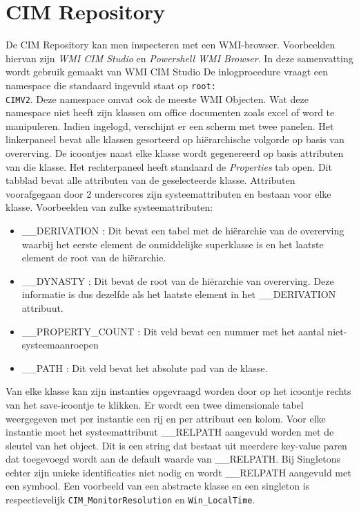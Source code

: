 \documentclass{report}
\begin{document}
	\section{CIM Repository}
	De CIM Repository kan men inspecteren met een WMI-browser. Voorbeelden hiervan zijn \textit{WMI CIM Studio} en \textit{Powershell WMI Browser}. In deze samenvatting wordt gebruik gemaakt van WMI CIM Studio
	De inlogprocedure vraagt een namespace die standaard ingevuld staat op \texttt{root:\\CIMV2}. Deze namespace omvat ook de meeste WMI Objecten. Wat deze namespace niet heeft zijn klassen om office documenten zoals excel of word te manipuleren.
	Indien ingelogd, verschijnt er een scherm met twee panelen. Het linkerpaneel bevat alle klassen gesorteerd op hiërarchische volgorde op basis van overerving. De icoontjes naast elke klasse wordt gegenereerd op basis attributen van die klasse.
	Het rechterpaneel heeft standaard de \textit{Properties} tab open. Dit tabblad bevat alle attributen van de geselecteerde klasse. Attributen voorafgegaan door 2 underscores zijn systeemattributen en bestaan voor elke klasse.
	Voorbeelden van zulke systeemattributen:
	\begin{itemize}
		\item \_\_DERIVATION : Dit bevat een tabel met de hiërarchie van de overerving waarbij het eerste element de onmiddelijke superklasse is en het laatste element de root van de hiërarchie.
		\item \_\_DYNASTY : Dit bevat de root van de hiërarchie van overerving. Deze informatie is dus dezelfde als het laatste element in het \_\_DERIVATION attribuut.
		\item \_\_PROPERTY\_COUNT : Dit veld bevat een nummer met het aantal niet-systeemaanroepen
		\item \_\_PATH : Dit veld bevat het absolute pad van de klasse.
	\end{itemize}
	Van elke klasse kan zijn instanties opgevraagd worden door op het icoontje rechts van het save-icoontje te klikken. Er wordt een twee dimensionale tabel weergegeven met per instantie een rij en per attribuut een kolom.
	Voor elke instantie moet het systeemattribuut \_\_RELPATH aangevuld worden met de sleutel van het object. Dit is een string dat bestaat uit meerdere key-value paren dat toegevoegd wordt aan de default waarde van \_\_RELPATH.
	Bij Singletons echter zijn unieke identificaties niet nodig en wordt \_\_RELPATH aangevuld met een \@ symbool. Een voorbeeld van een abstracte klasse en een singleton is respectievelijk \texttt{CIM\_MonitorResolution} en \texttt{Win\_LocalTime}. 
\end{document}
